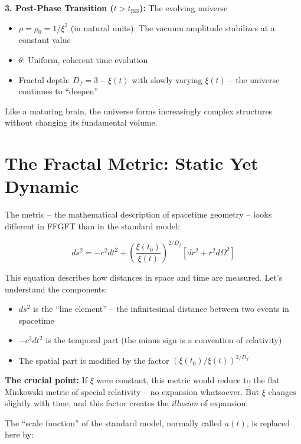 \textbf{3. Post-Phase Transition ($t > t_{\text{BB}}$):} The evolving universe

\begin{itemize}[leftmargin=*]
\item $\rho = \rho_0 = 1/\xi^2$ (in natural units): The vacuum amplitude stabilizes at a constant value
\item $\theta$: Uniform, coherent time evolution
\item Fractal depth: $D_f = 3 - \xi(t)$ with slowly varying $\xi(t)$ -- the universe continues to ``deepen''
\end{itemize}

Like a maturing brain, the universe forms increasingly complex structures without changing its fundamental volume.

\section{The Fractal Metric: Static Yet Dynamic}

The metric -- the mathematical description of spacetime geometry -- looks different in FFGFT than in the standard model:

\begin{equation}
ds^2 = -c^2 dt^2 + \left(\frac{\xi(t_0)}{\xi(t)}\right)^{2/D_f} \left[dr^2 + r^2 d\Omega^2\right]
\end{equation}

This equation describes how distances in space and time are measured. Let's understand the components:

\begin{itemize}[leftmargin=*]
\item $ds^2$ is the ``line element'' -- the infinitesimal distance between two events in spacetime
\item $-c^2 dt^2$ is the temporal part (the minus sign is a convention of relativity)
\item The spatial part is modified by the factor $(\xi(t_0)/\xi(t))^{2/D_f}$
\end{itemize}

\textbf{The crucial point:} If $\xi$ were constant, this metric would reduce to the flat Minkowski metric of special relativity -- no expansion whatsoever. But $\xi$ changes slightly with time, and this factor creates the \textit{illusion} of expansion.

The ``scale function'' of the standard model, normally called $a(t)$, is replaced here by:

